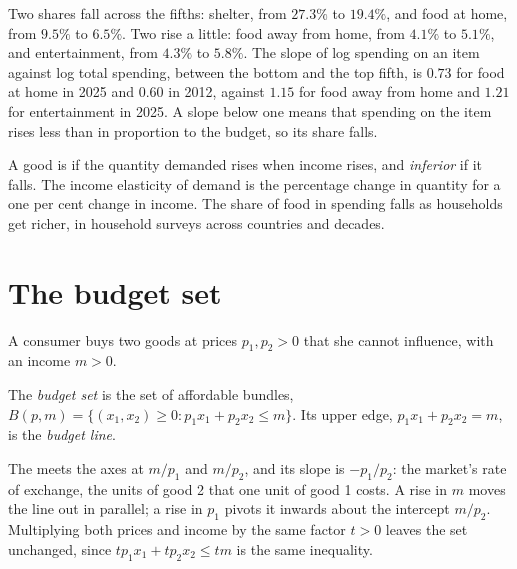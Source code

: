 Two shares fall across the fifths: shelter, from $27.3\%$ to $19.4\%$, and
food at home, from $9.5\%$ to $6.5\%$. Two rise a little: food away from
home, from $4.1\%$ to $5.1\%$, and entertainment, from $4.3\%$ to
$5.8\%$. %
The slope of log spending on an item against log total spending, between
the bottom and the top fifth, is $0.73$ for food at home in 2025 and $0.60$
in 2012, against $1.15$ for food away from home and $1.21$ for
entertainment in 2025. %
A slope below one means that spending on the item rises less than in
proportion to the budget, so its share falls.

\begin{recall}
A good is \emph{} if the quantity demanded rises when income rises,
and \emph{inferior} if it falls. The income elasticity of demand is the
percentage change in quantity for a one per cent change in income. The
share of food in spending falls as households get richer, in household
surveys across countries and decades.
\end{recall}

\section{The budget set}\label{sec:b1:consumer-choice:budget}

A consumer buys two goods at prices $p_1, p_2 > 0$ that she cannot
influence, with an income $m > 0$.

\begin{definition}\label{def:b1:consumer-choice:budget}
The \emph{budget set} is the set of affordable bundles,
$B(p, m) = \{(x_1, x_2) \ge 0 : p_1x_1 + p_2x_2 \le m\}$. Its upper edge,
$p_1x_1 + p_2x_2 = m$, is the \emph{budget line}.
\end{definition}

The  meets the axes at $m/p_1$ and $m/p_2$, and its slope is
$-p_1/p_2$: the market's rate of exchange, the units of good 2 that one unit
of good 1 costs. A rise in $m$ moves the line out in parallel; a rise in
$p_1$ pivots it inwards about the intercept $m/p_2$. Multiplying both prices
and income by the same factor $t > 0$ leaves the set unchanged, since
$tp_1x_1 + tp_2x_2 \le tm$ is the same inequality.

